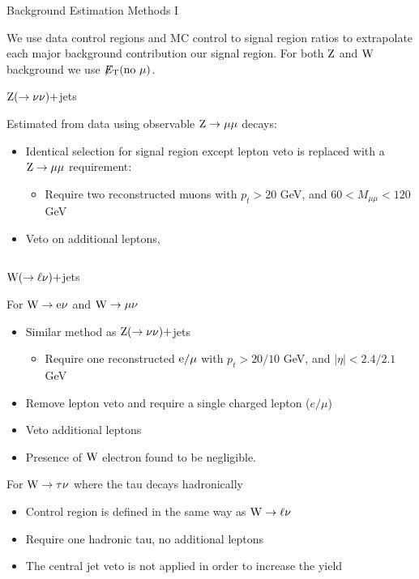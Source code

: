\documentclass[8pt]{beamer}
\newcommand\Fontvi{\fontsize{6}{7.2}\selectfont}
\newcommand{\met}{\displaystyle{\not} E_{\rm T}}
\newcommand{\W}{{\rm W}}
\newcommand{\Z}{{\rm Z}}
\begin{document}
\begin{frame}{Background Estimation Methods I}
\Fontvi 

We use data control regions and MC control to signal region ratios to extrapolate each major background contribution our signal region. For both $\Z$ and $\W$ background we use $\met(\text{no }\mu)$.
 
\begin{block}{$\Z (\rightarrow \nu \nu)+$jets}

Estimated from data using observable $\Z \rightarrow \mu \mu$ decays:

\begin{itemize}
 \item Identical selection for signal region except lepton veto is replaced with a $\Z \rightarrow \mu \mu$ requirement:
 \begin{itemize}
  \item {\Fontvi Require two reconstructed muons with $p_t > 20 $ GeV, and $60 < M_{\mu\mu}<120$ GeV }
 \end{itemize}
 \item Veto on additional leptons, 
\end{itemize}

\end{block}

\begin{columns}  

\begin{block}{$\W (\rightarrow \ell \nu)+$jets}

For $\W \rightarrow {\rm e} \nu$ and $\W \rightarrow \mu \nu$ 
\begin{itemize}
 \item Similar method as $\Z (\rightarrow \nu \nu)+$jets
 \begin{itemize}
  \item {\Fontvi  Require one reconstructed ${\rm e}/\mu$ with $p_t > 20/10 $ GeV, and $|\eta| < 2.4/2.1$ GeV}
 \end{itemize}
 \item Remove lepton veto and require a single charged lepton ($e/\mu$)
 \item Veto additional leptons
 \item Presence of $\W$ electron found to be negligible.
\end{itemize}

For $\W \rightarrow \tau\nu$ where the tau decays hadronically
\begin{itemize}
 \item Control region is defined in the same way as $\W \rightarrow \ell \nu$
 \item Require one hadronic tau, no additional leptons
 \item The central jet veto is not applied in order to increase the yield
\end{itemize}


\end{block}
\end{columns}
\end{frame}
\end{document}
